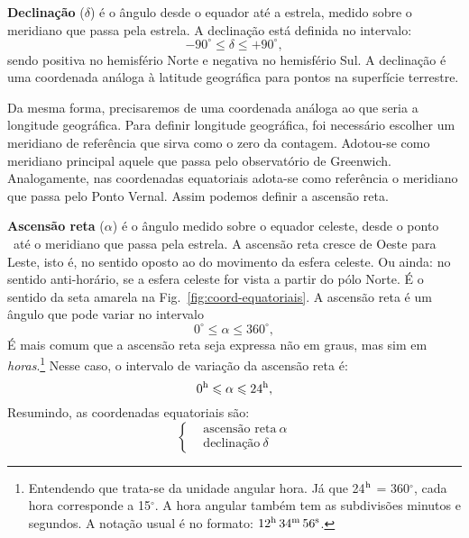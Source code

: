\textbf{Declinação} ($\delta$) é o ângulo desde o equador até a estrela, medido sobre o meridiano que passa pela estrela. A declinação está definida no intervalo:
%
\begin{equation}
-90^{\circ} \leqslant \delta \leqslant +90^{\circ},
\end{equation}
%
sendo positiva no hemisfério Norte e negativa no hemisfério Sul. A declinação é uma coordenada análoga à latitude geográfica para pontos na superfície terrestre.

Da mesma forma, precisaremos de uma coordenada análoga ao que seria a longitude geográfica. Para definir longitude geográfica, foi necessário escolher um meridiano de referência que sirva como o zero da contagem. Adotou-se como meridiano principal aquele que passa pelo observatório de Greenwich. Analogamente, nas coordenadas equatoriais adota-se como referência o meridiano que passa pelo Ponto Vernal. Assim podemos definir a ascensão reta.

\textbf{Ascensão reta} ($\alpha$) é o ângulo medido sobre o equador celeste, desde o ponto \Aries\ até o meridiano que passa pela estrela. A ascensão reta cresce de Oeste para Leste, isto é, no sentido oposto ao do movimento da esfera celeste. Ou ainda: no sentido anti-horário, se a esfera celeste for vista a partir do pólo Norte. É o sentido da seta amarela na Fig.~\ref{fig:coord-equatoriais}. A ascensão reta é um ângulo que pode variar no intervalo
%
\begin{equation}
0^{\circ} \leqslant \alpha \leqslant 360^{\circ},
\end{equation}
%
É mais comum que a ascensão reta seja expressa não em graus, mas sim em \textit{horas}.\footnote{Entendendo que trata-se da unidade angular hora. Já que 24$^{\rm h}$ = 360$^{\circ}$, cada hora corresponde a 15$^{\circ}$. A hora angular também tem as subdivisões minutos e segundos. A notação usual é no formato: $12^{\rm h}\,34^{\rm m}\,56^{\rm s}$.} Nesse caso, o intervalo de variação da ascensão reta é:
%
\begin{equation}
0^{\rm h} \leqslant \alpha \leqslant 24^{\rm h},
\end{equation}
%
Resumindo, as coordenadas equatoriais são:
%
\begin{equation*}
\left\{
\begin{aligned}
& \text{ascensão reta}~\alpha\\
& \text{declinação}~\delta
\end{aligned}
\right.
\end{equation*}

